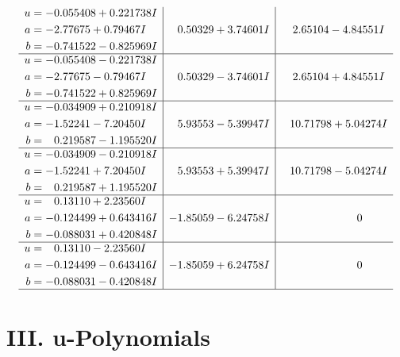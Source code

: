\documentclass[1p]{elsarticle_modified}
\theoremstyle{definition}
\begin{document}
$$\begin{array}{c|c|c}
\begin{aligned}
u &= -0.055408 + 0.221738 I \\
a &= -2.77675 + 0.79467 I \\
b &= -0.741522 - 0.825969 I\end{aligned}
 & \phantom{-}0.50329 + 3.74601 I & \phantom{-}2.65104 - 4.84551 I \\ \hline\begin{aligned}
u &= -0.055408 - 0.221738 I \\
a &= -2.77675 - 0.79467 I \\
b &= -0.741522 + 0.825969 I\end{aligned}
 & \phantom{-}0.50329 - 3.74601 I & \phantom{-}2.65104 + 4.84551 I \\ \hline\begin{aligned}
u &= -0.034909 + 0.210918 I \\
a &= -1.52241 - 7.20450 I \\
b &= \phantom{-}0.219587 - 1.195520 I\end{aligned}
 & \phantom{-}5.93553 - 5.39947 I & \phantom{-}10.71798 + 5.04274 I \\ \hline\begin{aligned}
u &= -0.034909 - 0.210918 I \\
a &= -1.52241 + 7.20450 I \\
b &= \phantom{-}0.219587 + 1.195520 I\end{aligned}
 & \phantom{-}5.93553 + 5.39947 I & \phantom{-}10.71798 - 5.04274 I \\ \hline\begin{aligned}
u &= \phantom{-}0.13110 + 2.23560 I \\
a &= -0.124499 + 0.643416 I \\
b &= -0.088031 + 0.420848 I\end{aligned}
 & -1.85059 - 6.24758 I & \phantom{-0.000000 } 0 \\ \hline\begin{aligned}
u &= \phantom{-}0.13110 - 2.23560 I \\
a &= -0.124499 - 0.643416 I \\
b &= -0.088031 - 0.420848 I\end{aligned}
 & -1.85059 + 6.24758 I & \phantom{-0.000000 } 0\\
 \hline 
 \end{array}$$\newpage
\newpage\renewcommand{\arraystretch}{1}
\centering \section*{ III. u-Polynomials}
\end{document}
